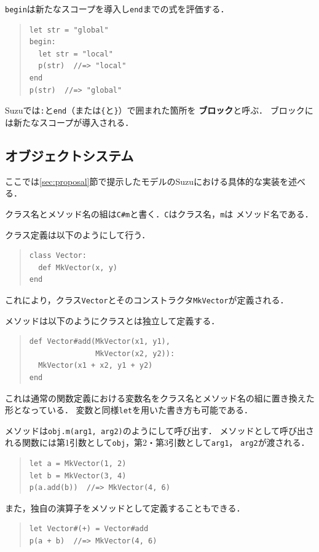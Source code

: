 \documentclass{ipsjprosym}
\begin{document}
\verb|begin|は新たなスコープを導入し\verb|end|までの式を評価する．
\begin{quote}
\begin{verbatim}
let str = "global"
begin:
  let str = "local"
  p(str)  //=> "local"
end
p(str)  //=> "global"
\end{verbatim}
\end{quote}
Suzuでは\verb|:|と\verb|end|（または\verb|{|と\verb|}|）で囲まれた箇所を
\textbf{ブロック}と呼ぶ．
ブロックには新たなスコープが導入される．

\subsection{オブジェクトシステム}

ここでは\ref{sec:proposal}節で提示したモデルのSuzuにおける具体的な実装を述べる．

クラス名とメソッド名の組は\verb|C#m|と書く．\verb|C|はクラス名，\verb|m|は
メソッド名である．

クラス定義は以下のようにして行う．
\begin{quote}
\begin{verbatim}
class Vector:
  def MkVector(x, y)
end
\end{verbatim}
\end{quote}
これにより，クラス\verb|Vector|とそのコンストラクタ\verb|MkVector|が定義される．

メソッドは以下のようにクラスとは独立して定義する．
\begin{quote}
\begin{verbatim}
def Vector#add(MkVector(x1, y1),
               MkVector(x2, y2)):
  MkVector(x1 + x2, y1 + y2)
end
\end{verbatim}
\end{quote}
これは通常の関数定義における変数名をクラス名とメソッド名の組に置き換えた形となっている．
変数と同様\verb|let|を用いた書き方も可能である．

メソッドは\verb|obj.m(arg1, arg2)|のようにして呼び出す．
メソッドとして呼び出される関数には第1引数として\verb|obj|，第2・第3引数として\verb|arg1|，
\verb|arg2|が渡される．
\begin{quote}
\begin{verbatim}
let a = MkVector(1, 2)
let b = MkVector(3, 4)
p(a.add(b))  //=> MkVector(4, 6)
\end{verbatim}
\end{quote}
また，独自の演算子をメソッドとして定義することもできる．
\begin{quote}
\begin{verbatim}
let Vector#(+) = Vector#add
p(a + b)  //=> MkVector(4, 6)
\end{verbatim}
\end{quote}
\end{document}
